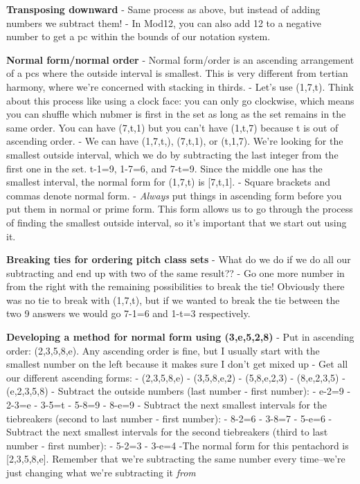 \documentclass{book}
\begin{document}
\textbf{Transposing downward} - Same process as above, but instead of adding
numbers we subtract them! - In Mod12, you can also add 12 to a negative number
to get a pc within the bounds of our notation system.

\textbf{Normal form/normal order} - Normal form/order is an ascending
arrangement of a pcs where the outside interval is smallest. This is very
different from tertian harmony, where we're concerned with stacking in thirds.
- Let's use (1,7,t). Think about this process like using a clock face: you can
only go clockwise, which means you can shuffle which nubmer is first in the
set as long as the set remains in the same order. You can have (7,t,1) but you
can't have (1,t,7) because t is out of ascending order. - We can have
(1,7,t,), (7,t,1), or (t,1,7). We're looking for the smallest outside
interval, which we do by subtracting the last integer from the first one in
the set. t-1=9, 1-7=6, and 7-t=9. Since the middle one has the smallest
interval, the normal form for (1,7,t) is {[}7,t,1{]}. - Square brackets and
commas denote normal form. - \emph{Always} put things in ascending form before
you put them in normal or prime form. This form allows us to go through the
process of finding the smallest outside interval, so it's important that we
start out using it.

\textbf{Breaking ties for ordering pitch class sets} - What do we do if we do
all our subtracting and end up with two of the same result?? - Go one more
number in from the right with the remaining possibilities to break the tie!
Obviously there was no tie to break with (1,7,t), but if we wanted to break
the tie between the two 9 answers we would go 7-1=6 and 1-t=3 respectively.

\textbf{Developing a method for normal form using (3,e,5,2,8)} - Put in
ascending order: (2,3,5,8,e). Any ascending order is fine, but I usually start
with the smallest number on the left because it makes sure I don't get mixed
up - Get all our different ascending forms: - (2,3,5,8,e) - (3,5,8,e,2) -
(5,8,e,2,3) - (8,e,2,3,5) - (e,2,3,5,8) - Subtract the outside numbers (last
number - first number): - e-2=9 - 2-3=e - 3-5=t - 5-8=9 - 8-e=9 - Subtract the
next smallest intervals for the tiebreakers (second to last number - first
number): - 8-2=6 - 3-8=7 - 5-e=6 - Subtract the next smallest intervals for
the second tiebreakers (third to last number - first number): - 5-2=3 - 3-e=4
-The normal form for this pentachord is {[}2,3,5,8,e{]}. Remember that we're
subtracting the same number every time--we're just changing what we're
subtracting it \emph{from}
\end{document}
